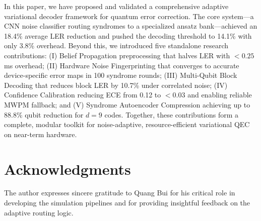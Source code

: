 \documentclass[journal,twocolumn]{IEEEtran}
\begin{document}
In this paper, we have proposed and validated a comprehensive adaptive variational decoder framework for quantum error correction. The core system—a CNN noise classifier routing syndromes to a specialized ansatz bank—achieved an 18.4\% average LER reduction and pushed the decoding threshold to 14.1\% with only 3.8\% overhead. Beyond this, we introduced five standalone research contributions: (I) Belief Propagation preprocessing that halves LER with $<0.25$\,ms overhead; (II) Hardware Noise Fingerprinting that converges to accurate device-specific error maps in 100 syndrome rounds; (III) Multi-Qubit Block Decoding that reduces block LER by 10.7\% under correlated noise; (IV) Confidence Calibration reducing ECE from 0.12 to $<0.03$ and enabling reliable MWPM fallback; and (V) Syndrome Autoencoder Compression achieving up to 88.8\% qubit reduction for $d=9$ codes. Together, these contributions form a complete, modular toolkit for noise-adaptive, resource-efficient variational QEC on near-term hardware.

\section*{Acknowledgments}
The author expresses sincere gratitude to Quang Bui for his critical role in developing the simulation pipelines and for providing insightful feedback on the adaptive routing logic.
\end{document}
